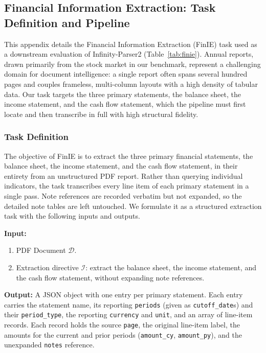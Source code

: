 \subsection{Financial Information Extraction: Task Definition and Pipeline}
\label{appendix:fie}

This appendix details the Financial Information Extraction (FinIE) task used as a downstream evaluation of Infinity-Parser2 (Table~\ref{tab:finie}). Annual reports, drawn primarily from the stock market in our benchmark, represent a challenging domain for document intelligence: a single report often spans several hundred pages and couples frameless, multi-column layouts with a high density of tabular data. Our task targets the three primary statements, the balance sheet, the income statement, and the cash flow statement, which the pipeline must first locate and then transcribe in full with high structural fidelity.

\subsubsection*{Task Definition}
The objective of FinIE is to extract the three primary financial statements, the balance sheet, the income statement, and the cash flow statement, in their entirety from an unstructured PDF report. Rather than querying individual indicators, the task transcribes every line item of each primary statement in a single pass. Note references are recorded verbatim but not expanded, so the detailed note tables are left untouched. We formulate it as a structured extraction task with the following inputs and outputs.

\begin{tcolorbox}[
  colback=gray!5,
  colframe=gray!60,
  title={Definition of FinIE},
  fonttitle=\bfseries,
  breakable
]
\textbf{Input:} \\
\begin{enumerate}[
  leftmargin=1.0em,
  labelsep=0.5em
]
\item PDF Document $\mathcal{D}$.
\item Extraction directive $\mathcal{I}$: extract the balance sheet, the income statement, and the cash flow statement, without expanding note references.
\end{enumerate}

\medskip
\textbf{Output:} A JSON object with one entry per primary statement. Each entry carries the statement name, its reporting \texttt{periods} (given as \texttt{cutoff\_date}s) and their \texttt{period\_type}, the reporting \texttt{currency} and \texttt{unit}, and an array of line-item records. Each record holds the source \texttt{page}, the original line-item label, the amounts for the current and prior periods (\texttt{amount\_cy}, \texttt{amount\_py}), and the unexpanded \texttt{notes} reference.
\end{tcolorbox}

